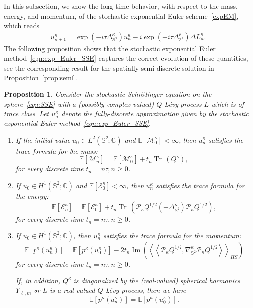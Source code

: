 \documentclass[11pt]{amsart}
\newtheorem{proposition}[theorem]{Proposition}
\newcommand{\IC}{\mathbb{C}}
\newcommand{\E}{{\mathbb E}}
\newcommand{\IS}{\mathbb{S}}
\newcommand{\tr}{{\operatorname{Tr}\, }}
\newcommand{\cE}{\mathcal E}
\newcommand{\cM}{\mathcal M}
\newcommand{\expp}[1]{\exp\left(#1\right)}
\newcommand{\Deltalb}{\Delta_{\IS^2}}
\newcommand{\nablalb}{\nabla_{\IS^{2}}}
\newcommand{\cP}{\mathcal{P}}
\begin{document}
In this subsection, we show the long-time behavior, with respect to the mass, energy, and momentum, of the stochastic exponential Euler scheme~\eqref{expEM}, which reads
\begin{align}
        \label{eqn:exp_Euler_SSE}
    u^\kappa_{n+1} = \expp{-i\tau\Deltalb^\kappa} u^\kappa_n - i\expp{-i\tau\Deltalb^\kappa}\Delta L^\kappa_{n}.
\end{align}
The following proposition shows that the stochastic exponential Euler method~\eqref{eqn:exp_Euler_SSE} captures the correct evolution of these quantities,
see the corresponding result for the spatially semi-discrete solution in Proposition~\ref{prop:semi}.
\begin{proposition}
    \label{prop:semi_exp}
    Consider the stochastic Schrödinger equation on the sphere~\eqref{eqn:SSE} with a (possibly complex-valued) $Q$-L\'evy process $L$ which is of trace class.
    Let $u^\kappa_n$ denote the fully-discrete approximation given by the stochastic exponential Euler method~\eqref{eqn:exp_Euler_SSE}.
    \begin{enumerate}[label=\roman*)]
    \item If the initial value $u_0 \in {L^2(\IS^2; \IC)}$ and $\E\left[\cM^\kappa_0\right] < \infty$, then
    $u^\kappa_n$ satisfies the trace formula for the mass:
    \begin{equation}\label{longexpM}
        \E\left[\cM^\kappa_n\right] = \E\left[\cM^\kappa_0\right] + t_n\tr(Q^\kappa),
    \end{equation}
    for every discrete time $t_n = n\tau, n \geq 0$.
    \item If $u_0 \in {H^1(\IS^2; \IC)}$ and $\E\left[\cE^\kappa_0\right] < \infty$, then
    $u^\kappa_n$ satisfies the trace formula for the energy:
    \begin{equation}\label{longexpE}
        \E\left[\cE^\kappa_n\right] = \E\left[\cE^\kappa_0\right] + t_n\tr\left(\cP_\kappa Q^{1/2}(-\Deltalb^\kappa) \cP_\kappa Q^{1/2}\right),
    \end{equation}
    for every discrete time $t_n = n\tau, n \geq 0$.
    \item If $u_0 \in {H^1(\IS^2; \IC)}$, then $u^\kappa_n$ satisfies the trace formula for the momentum:
\begin{equation}\label{longexpMom}
	\E\left[p^\kappa(u^\kappa_n)\right] = \E\left[p^\kappa(u^\kappa_0)\right] -2t_n\operatorname{Im}\left(\left<\left<\cP_\kappa Q^{1/2},\nablalb^\kappa \cP_\kappa Q^{1/2}\right>\right>_{HS}\right)
\end{equation}
    for every discrete time $t_n = n\tau, n \geq 0$.

If, in addition, $Q^\kappa$ is diagonalized by the (real-valued) spherical harmonics $Y_{\ell,m}$ or $L$ is a real-valued $Q$-L\'evy process, then we have
$$
\E\left[p^\kappa(u^\kappa_n)\right] = \E\left[p^\kappa(u^\kappa_0)\right].
$$
\end{enumerate}
\end{proposition}
\end{document}
